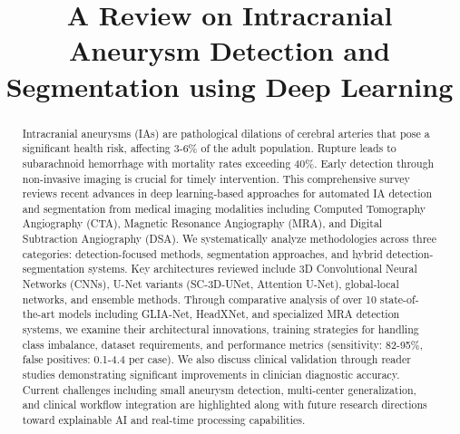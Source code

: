 \documentclass[conference]{IEEEtran}
\begin{document}
\title{A Review on Intracranial Aneurysm Detection and Segmentation using Deep Learning}

\author{
}

\maketitle

\begin{abstract}
Intracranial aneurysms (IAs) are pathological dilations of cerebral arteries that pose a significant health risk, affecting 3-6\% of the adult population. Rupture leads to subarachnoid hemorrhage with mortality rates exceeding 40\%. Early detection through non-invasive imaging is crucial for timely intervention. This comprehensive survey reviews recent advances in deep learning-based approaches for automated IA detection and segmentation from medical imaging modalities including Computed Tomography Angiography (CTA), Magnetic Resonance Angiography (MRA), and Digital Subtraction Angiography (DSA). We systematically analyze methodologies across three categories: detection-focused methods, segmentation approaches, and hybrid detection-segmentation systems. Key architectures reviewed include 3D Convolutional Neural Networks (CNNs), U-Net variants (SC-3D-UNet, Attention U-Net), global-local networks, and ensemble methods. Through comparative analysis of over 10 state-of-the-art models including GLIA-Net, HeadXNet, and specialized MRA detection systems, we examine their architectural innovations, training strategies for handling class imbalance, dataset requirements, and performance metrics (sensitivity: 82-95\%, false positives: 0.1-4.4 per case). We also discuss clinical validation through reader studies demonstrating significant improvements in clinician diagnostic accuracy. Current challenges including small aneurysm detection, multi-center generalization, and clinical workflow integration are highlighted along with future research directions toward explainable AI and real-time processing capabilities.
\end{abstract}
\end{document}
